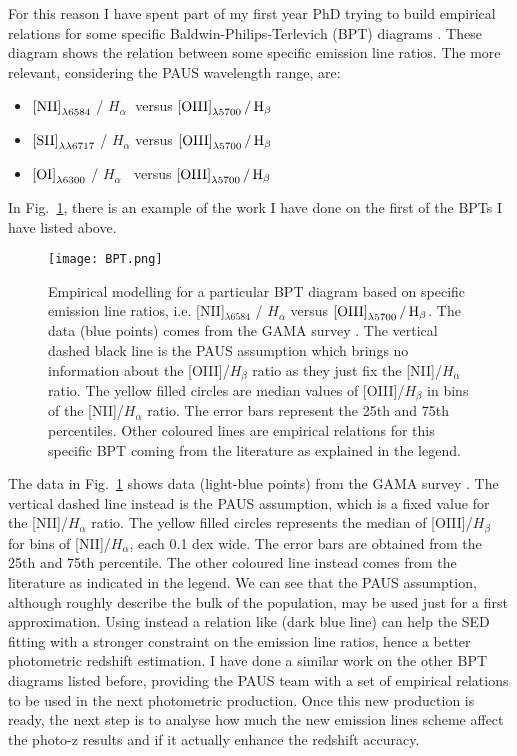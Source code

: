 \documentclass[11pt]{article}
\begin{document}
For this reason I have spent part of my first year PhD trying to build empirical relations for some specific Baldwin-Philips-Terlevich (BPT) diagrams \citep{baldwin81}. These diagram shows the relation between some specific emission line ratios. The more relevant, considering the PAUS wavelength range, are:
\begin{itemize}
\item $\rm{[NII]}_{\lambda6584}$ / $H_{\alpha}\;$ versus $\rm{[OIII]}_{\lambda 5700} \, / \, H_{\beta}$
\item $\rm{[SII]}_{\lambda\lambda6717}$ / $H_{\alpha}$ versus $\rm{[OIII]}_{\lambda 5700} \, / \, H_{\beta}$
\item $\rm{[OI]}_{\lambda6300}$  / $H_{\alpha} \;\;$ versus $\rm{[OIII]}_{\lambda 5700} \, / \, H_{\beta}$
\end{itemize}
In Fig.~\ref{fig:BPT}, there is an example of the work I have done on the first of the BPTs I have listed above.
%
\begin{figure}
\centering
\texttt{[image: BPT.png]}
\caption{Empirical modelling for a particular BPT diagram based on specific emission line ratios, i.e. [NII]$_{\lambda6584}$ / $H_{\alpha}$ versus $\rm{[OIII]}_{\lambda 5700} \, / \, H_{\beta}$. The data (blue points) comes from the GAMA survey \citep{driver11}. The vertical dashed black line is the PAUS assumption which brings no information about the [OIII]/$H_{\beta}$ ratio as they just fix the [NII]/$H_{\alpha}$ ratio. The yellow filled circles are median values of [OIII]/$H_{\beta}$ in bins of the [NII]/$H_{\alpha}$ ratio. The error bars represent the 25th and 75th percentiles. Other coloured lines are empirical relations for this specific BPT coming from the literature as explained in the legend.}
\label{fig:BPT}
\end{figure}
%
The data in Fig.~\ref{fig:BPT} shows data (light-blue points) from the GAMA survey \citep{driver11}. The vertical dashed line instead is the PAUS assumption, which is a fixed value for the [NII]/$H_{\alpha}$ ratio. The yellow filled circles represents the median of [OIII]/$H_{\beta}$ for bins of [NII]/$H_{\alpha}$, each 0.1 dex wide. The error bars are obtained from the 25th and 75th percentile. The other coloured line instead comes from the literature as indicated in the legend. We can see that the PAUS assumption, although roughly describe the bulk of the population, may be used just for a first approximation. Using instead a relation like \citealt{faisst18} (dark blue line) can help the SED fitting with a stronger constraint on the emission line ratios, hence a better photometric redshift estimation.  
I have done a similar work on the other BPT diagrams listed before, providing the PAUS team with a set of empirical relations to be used in the next photometric production. 
Once this new production is ready, the next step is to analyse how much the new emission lines scheme affect the photo-z results and if it actually enhance the redshift accuracy.
\end{document}
